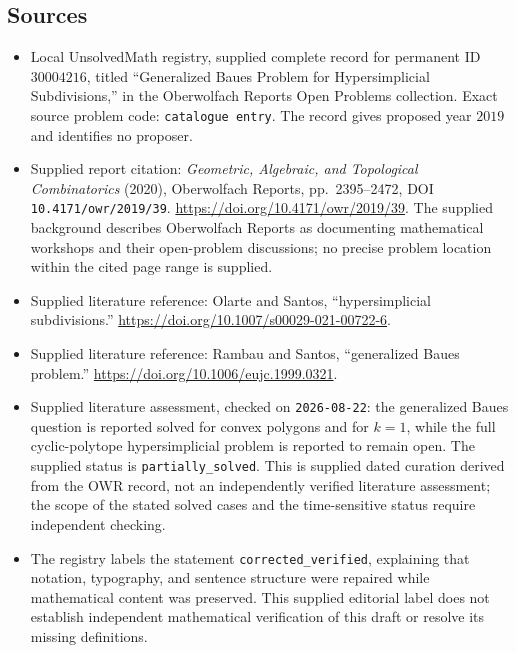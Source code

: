 \documentclass[11pt]{article}
\begin{document}
\subsection{Sources}
\begin{itemize}
\item Local UnsolvedMath registry, supplied complete record for permanent ID \(30004216\), titled ``Generalized Baues Problem for Hypersimplicial Subdivisions,'' in the Oberwolfach Reports Open Problems collection. Exact source problem code: \texttt{catalogue entry}. The record gives proposed year \(2019\) and identifies no proposer.
\item Supplied report citation: \emph{Geometric, Algebraic, and Topological Combinatorics} (2020), Oberwolfach Reports, pp.~2395--2472, DOI \texttt{10.4171/owr/2019/39}. \url{https://doi.org/10.4171/owr/2019/39}. The supplied background describes Oberwolfach Reports as documenting mathematical workshops and their open-problem discussions; no precise problem location within the cited page range is supplied.
\item Supplied literature reference: Olarte and Santos, ``hypersimplicial subdivisions.'' \url{https://doi.org/10.1007/s00029-021-00722-6}.
\item Supplied literature reference: Rambau and Santos, ``generalized Baues problem.'' \url{https://doi.org/10.1006/eujc.1999.0321}.
\item Supplied literature assessment, checked on \texttt{2026-08-22}: the generalized Baues question is reported solved for convex polygons and for \(k=1\), while the full cyclic-polytope hypersimplicial problem is reported to remain open. The supplied status is \texttt{partially\_solved}. This is supplied dated curation derived from the OWR record, not an independently verified literature assessment; the scope of the stated solved cases and the time-sensitive status require independent checking.
\item The registry labels the statement \texttt{corrected\_verified}, explaining that notation, typography, and sentence structure were repaired while mathematical content was preserved. This supplied editorial label does not establish independent mathematical verification of this draft or resolve its missing definitions.
\end{itemize}
\end{document}
